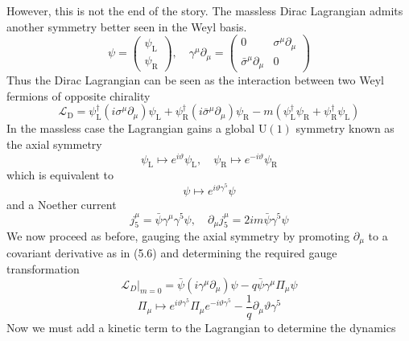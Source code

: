 \documentclass[11pt, a4paper]{article}
\theoremstyle{definition}
\theoremstyle{plain}
\begin{document}
However, this is not the end of the story. The massless Dirac Lagrangian admits
another symmetry better seen in the Weyl basis.
\begin{equation}
  \psi =
  \begin{pmatrix} \psi_\mathrm{L} \\ \psi_\mathrm{R} \end{pmatrix}, \quad
  \gamma^{\mu}\partial_\mu =
  \begin{pmatrix}0 & \sigma^\mu\partial_\mu \\ \bar{\sigma}^{\mu}\partial_\mu & 0 \end{pmatrix}
\end{equation}
Thus the Dirac Lagrangian can be seen as the interaction between two Weyl fermions
of opposite chirality
\begin{equation}
  \mathcal{L}_\mathrm{D} = \psi_\mathrm{L}^{\dagger}(i\sigma^\mu\partial_\mu)\psi_\mathrm{L} +
  \psi_\mathrm{R}^{\dagger}(i\bar{\sigma}^\mu\partial_\mu)\psi_\mathrm{R}
  - m(\psi_\mathrm{L}^{\dagger}\psi_\mathrm{R} + \psi_\mathrm{R}^{\dagger}\psi_\mathrm{L})
\end{equation}
In the massless case the Lagrangian gains a global $\mathrm{U}(1)$ symmetry
known as the axial symmetry
\begin{equation}
  \psi_\mathrm{L} \mapsto e^{i\vartheta}\psi_\mathrm{L}, \quad
  \psi_\mathrm{R} \mapsto e^{-i\vartheta}\psi_\mathrm{R}
\end{equation}
which is equivalent to 
\begin{equation}
  \psi \mapsto e^{i\vartheta\gamma^5}\psi
\end{equation}
and a Noether current
\begin{equation}
  j^\mu_5 = \bar{\psi}\gamma^\mu\gamma^5\psi, \quad \partial_\mu j^\mu_5 = 2im\bar{\psi}\gamma^5\psi
\end{equation}
We now proceed as before, gauging the axial symmetry by promoting $\partial_\mu$
to a covariant derivative as in (5.6) and determining the required gauge transformation
\begin{equation}
  {\mathcal{L}_{D}|}_{m=0} = \bar{\psi}(i\gamma^\mu \partial_\mu)\psi
  - q\bar{\psi}\gamma^\mu\Pi_\mu\psi
\end{equation}
\begin{equation}
  \Pi_\mu \mapsto e^{i\vartheta\gamma^5}\Pi_\mu e^{-i\vartheta\gamma^5} 
  - \frac{1}{q}\partial_\mu\vartheta\gamma^5
\end{equation}
Now we must add a kinetic term to the Lagrangian to determine the dynamics 
\end{document}
